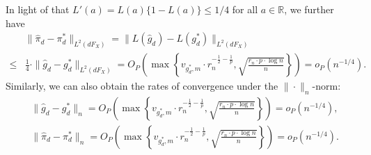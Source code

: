 \documentclass[11pt]{article}
\numberwithin{equation}{section}
\begin{document}
In light of that $L'(a)=L(a)\{1-L(a)\}\leq 1/4$ for all $a\in\mathbb{R}$, we further have
\begin{align*}
	&\|\widehat{\pi}_d-\pi_d^*\|_{L^2(dF_X)}=\|L\left(\widehat{g}_d\right)-L\left(g_d^*\right)\|_{L^2(dF_X)}\\
	\leq &\frac{1}{4}\cdot\|\widehat{g}_d-g_d^*\|_{L^2(dF_X)}= O_P\left(\max\left\{v_{g_d^*,m}\cdot r_n^{-\frac{1}{2}-\frac{1}{p}},\sqrt{\frac{r_n\cdot p\cdot \log n}{n}}\right\}\right)=o_P\left(n^{-1/4}\right).
\end{align*}
Similarly, we can also obtain the rates of convergence under the $\|\cdot\|_n$-norm:
\begin{align*}
	&\|\widehat{g}_d-g_d^*\|_{n}=O_P\left(\max\left\{v_{g_d^*,m}\cdot r_n^{-\frac{1}{2}-\frac{1}{p}},\sqrt{\frac{r_n\cdot p\cdot \log n}{n}}\right\}\right)=o_P\left(n^{-1/4}\right),\\
	&\|\widehat{\pi}_d-\pi_d^*\|_{n}=O_P\left(\max\left\{v_{g_d^*,m}\cdot r_n^{-\frac{1}{2}-\frac{1}{p}},\sqrt{\frac{r_n\cdot p\cdot \log n}{n}}\right\}\right)=o_P\left(n^{-1/4}\right).
\end{align*}
\end{document}
